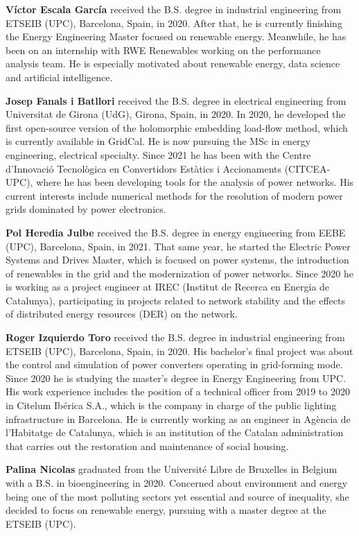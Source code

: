 \textbf{Víctor Escala García} received the B.S. degree in industrial engineering from ETSEIB (UPC), Barcelona, Spain, in 2020. After that, he is currently finishing the Energy Engineering Master focused on renewable energy. Meanwhile, he has been on an internship with RWE Renewables working on the performance analysis team. He is especially motivated about renewable energy, data science and artificial intelligence. 

\textbf{Josep Fanals i Batllori} received the B.S. degree in electrical engineering from Universitat de Girona (UdG), Girona, Spain, in 2020. In 2020, he developed the first open-source version of the holomorphic embedding load-flow method, which is currently available in GridCal. He is now pursuing the MSc in energy engineering, electrical specialty. Since 2021 he has been with the Centre d'Innovació Tecnològica en Convertidors Estàtics i Accionaments (CITCEA-UPC), where he has been developing tools for the analysis of power networks. His current interests include numerical methods for the resolution of modern power grids dominated by power electronics. 

\textbf{Pol Heredia Julbe} received the B.S. degree in energy engineering from EEBE (UPC), Barcelona, Spain, in 2021. That same year, he started the Electric Power Systems and Drives Master, which is focused on power systems, the introduction of renewables in the grid and the modernization of power networks. Since 2020 he is working as a project engineer at IREC (Institut de Recerca en Energia de Catalunya), participating in projects related to network stability and the effects of distributed energy resources (DER) on the network.

\textbf{Roger Izquierdo Toro} received the B.S. degree in industrial engineering from ETSEIB (UPC), Barcelona, Spain, in 2020. His bachelor's final project was about the control and simulation of power converters operating in grid-forming mode. Since 2020 he is studying the master's degree in Energy Engineering from UPC. His work experience includes the position of a technical officer from 2019 to 2020 in Citelum Ibérica S.A., which is the company in charge of the public lighting infrastructure in Barcelona. He is currently working as an engineer in Agència de l'Habitatge de Catalunya, which is an institution of the Catalan administration that carries out the restoration and maintenance of social housing. 

\textbf{Palina Nicolas} graduated from the Université Libre de Bruxelles in Belgium with a B.S. in bioengineering in 2020. Concerned about environment and energy being one of the most polluting sectors yet essential and source of inequality, she decided to focus on renewable energy, pursuing with a master degree at the ETSEIB (UPC). 

